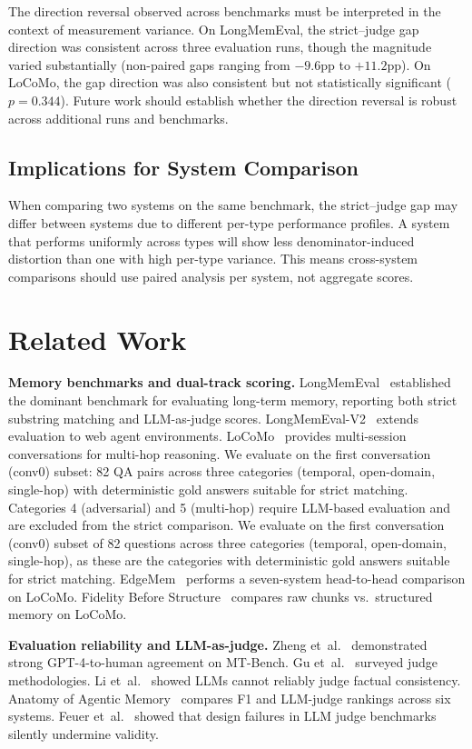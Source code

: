 \documentclass{article}
\begin{document}
The direction reversal observed across benchmarks must be interpreted in the context of measurement variance. On LongMemEval, the strict--judge gap direction was consistent across three evaluation runs, though the magnitude varied substantially (non-paired gaps ranging from $-9.6$pp to $+11.2$pp). On LoCoMo, the gap direction was also consistent but not statistically significant ($p = 0.344$). Future work should establish whether the direction reversal is robust across additional runs and benchmarks.

\subsection{Implications for System Comparison}
When comparing two systems on the same benchmark, the strict--judge gap may differ between systems due to different per-type performance profiles. A system that performs uniformly across types will show less denominator-induced distortion than one with high per-type variance. This means cross-system comparisons should use paired analysis per system, not aggregate scores.

\section{Related Work}
\textbf{Memory benchmarks and dual-track scoring.} LongMemEval~\citep{wu2024longmemeval} established the dominant benchmark for evaluating long-term memory, reporting both strict substring matching and LLM-as-judge scores. LongMemEval-V2~\citep{longmemevalv2} extends evaluation to web agent environments. LoCoMo~\citep{locomo2024} provides multi-session conversations for multi-hop reasoning. We evaluate on the first conversation (conv0) subset: 82 QA pairs across three categories (temporal, open-domain, single-hop) with deterministic gold answers suitable for strict matching. Categories 4 (adversarial) and 5 (multi-hop) require LLM-based evaluation and are excluded from the strict comparison. We evaluate on the first conversation (conv0) subset of 82 questions across three categories (temporal, open-domain, single-hop), as these are the categories with deterministic gold answers suitable for strict matching. EdgeMem~\citep{edgemem2025} performs a seven-system head-to-head comparison on LoCoMo. Fidelity Before Structure~\citep{fidelity2026} compares raw chunks vs.\ structured memory on LoCoMo.

\textbf{Evaluation reliability and LLM-as-judge.} Zheng et~al.~\citep{zheng2023judge} demonstrated strong GPT-4-to-human agreement on MT-Bench. Gu et~al.~\citep{gu2024judgesurvey} surveyed judge methodologies. Li et~al.~\citep{li2025unreliable} showed LLMs cannot reliably judge factual consistency. Anatomy of Agentic Memory~\citep{anatomy2026} compares F1 and LLM-judge rankings across six systems. Feuer et~al.~\citep{feuer2025noise} showed that design failures in LLM judge benchmarks silently undermine validity.
\end{document}
